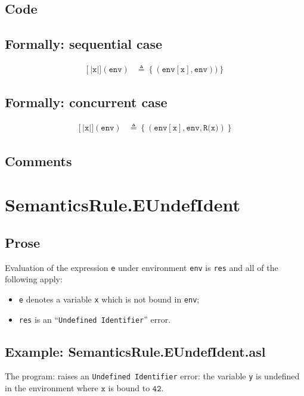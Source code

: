\documentclass{book}
\newcommand\llbracket{[|}
\newcommand\rrbracket{|]}
\newcommand\interp[1]{\left\llbracket #1 \right\rrbracket}
\begin{document}
  \subsection{Code}

  \subsection{Formally: sequential case}
  \begin{align}
  \interp{\texttt{x}}(\texttt{env}) & \triangleq \left\{ (\texttt{env}[\texttt{x}], \texttt{env})) \right\}
  \label{eq:sem-seq-var}
  \end{align} 
 
  \subsection{Formally: concurrent case}
  \begin{align}
  \interp{\texttt{x}}(\texttt{env}) & \triangleq \left\{ (\texttt{env}[\texttt{x}], \texttt{env}, \texttt{R(x)}) \right\}
  \label{eq:sem-conc-var}
  \end{align} 

  \subsection{Comments}

\section{SemanticsRule.EUndefIdent \label{sec:SemanticsRule.EUndefIdent}}

  \subsection{Prose}
  Evaluation of the expression \texttt{e} under environment \texttt{env} is
  \texttt{res} and all of the following apply:
  \begin{itemize}
  \item \texttt{e} denotes a variable \texttt{x} which is not bound in \texttt{env};
  \item \texttt{res} is an ``\texttt{Undefined Identifier}'' error.
  \end{itemize}

  \subsection{Example: SemanticsRule.EUndefIdent.asl}
    The program:
    raises an \texttt{Undefined Identifier} error: the variable \texttt{y} is
    undefined in the environment where $\mathtt{x}$ is bound to $\mathtt{42}$.
\end{document}
